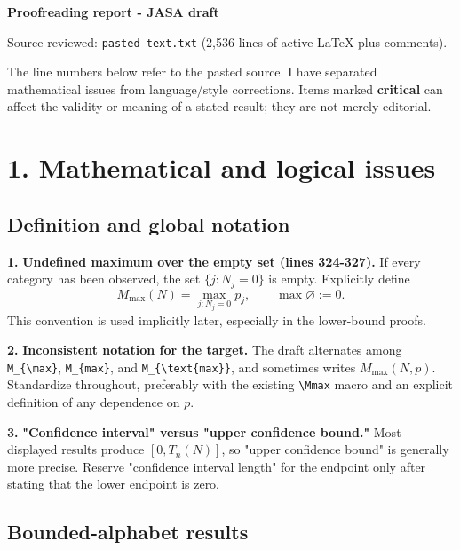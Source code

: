 \documentclass[10pt,a4paper]{article}
\begin{document}
\begin{center}\LARGE\bfseries Proofreading report - JASA draft\end{center}

Source reviewed: \texttt{pasted-text.txt} (2,536 lines of active LaTeX plus comments).

The line numbers below refer to the pasted source. I have separated mathematical issues from language/style corrections. Items marked \textbf{critical} can affect the validity or meaning of a stated result; they are not merely editorial.

\section*{1. Mathematical and logical issues}

\subsection*{Definition and global notation}

\par\medskip\noindent\textbf{1.} \textbf{Undefined maximum over the empty set (lines 324-327).} If every category has been observed, the set \(\{j:N_j=0\}\) is empty. Explicitly define
\[
   M_{\max}(N)=\max_{j:N_j=0}p_j,\qquad \max\varnothing:=0.
\]
This convention is used implicitly later, especially in the lower-bound proofs.

\par\medskip\noindent\textbf{2.} \textbf{Inconsistent notation for the target.} The draft alternates among \texttt{M\_\allowbreak{}\{\allowbreak{}\textbackslash{}\allowbreak{}max\}\allowbreak{}}, \texttt{M\_\allowbreak{}\{\allowbreak{}max\}\allowbreak{}}, and \texttt{M\_\allowbreak{}\{\allowbreak{}\textbackslash{}\allowbreak{}text\{\allowbreak{}max\}\allowbreak{}\}\allowbreak{}}, and sometimes writes \(M_{\max}(N,p)\). Standardize throughout, preferably with the existing \texttt{\textbackslash{}\allowbreak{}Mmax} macro and an explicit definition of any dependence on \(p\).

\par\medskip\noindent\textbf{3.} \textbf{"Confidence interval" versus "upper confidence bound."} Most displayed results produce \([0,T_n(N)]\), so "upper confidence bound" is generally more precise. Reserve "confidence interval length" for the endpoint only after stating that the lower endpoint is zero.

\subsection*{Bounded-alphabet results}
\end{document}
